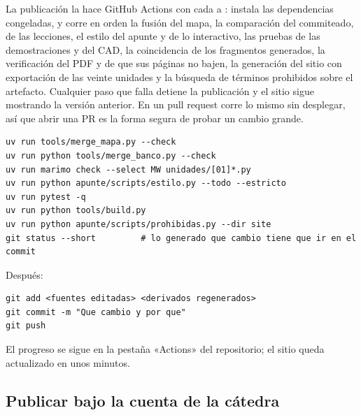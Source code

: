 \documentclass[11pt,a4paper]{report}
\newcommand{\clave}[1]{\texttt{\detokenize{#1}}}
\begin{document}
La publicación la hace GitHub Actions con cada \clave{push} a \clave{main}: instala las dependencias congeladas, y corre en orden la fusión del mapa, la comparación del  commiteado, \clave{marimo check} de las lecciones, el estilo del apunte y de lo interactivo, las pruebas de las demostraciones y del CAD, la coincidencia de los fragmentos generados, la verificación del PDF y de que sus páginas no bajen, la generación del sitio con exportación de las veinte unidades y la búsqueda de términos prohibidos sobre el artefacto. Cualquier paso que falla detiene la publicación y el sitio sigue mostrando la versión anterior. En un pull request corre lo mismo sin desplegar, así que abrir una PR es la forma segura de probar un cambio grande.

\begin{resultado}
\begin{lstlisting}[style=terminal]
uv run tools/merge_mapa.py --check
uv run python tools/merge_banco.py --check
uv run marimo check --select MW unidades/[01]*.py
uv run python apunte/scripts/estilo.py --todo --estricto
uv run pytest -q
uv run python tools/build.py
uv run python apunte/scripts/prohibidas.py --dir site
git status --short         # lo generado que cambio tiene que ir en el commit
\end{lstlisting}
\end{resultado}

Después:
\begin{lstlisting}[style=terminal]
git add <fuentes editadas> <derivados regenerados>
git commit -m "Que cambio y por que"
git push
\end{lstlisting}
El progreso se sigue en la pestaña «Actions» del repositorio; el sitio queda actualizado en unos minutos.

\subsection{Publicar bajo la cuenta de la cátedra}
\end{document}
